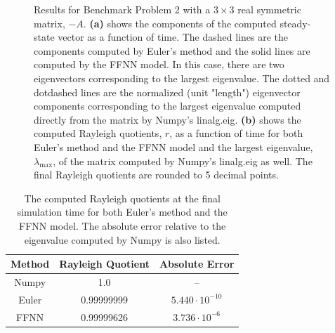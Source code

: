 \begin{figure}[H]
\centering
{}
\qquad
{}
\caption{Results for Benchmark Problem 2 with a $3\times 3$ real symmetric matrix, $-A$. \textbf{(a)} shows the components of the computed steady-state vector as a function of time. The dashed lines are the components computed by Euler's method and the solid lines are computed by the FFNN model. In this case, there are two eigenvectors corresponding to the largest eigenvalue. The dotted and dotdashed lines are the normalized (unit "length") eigenvector components corresponding to the largest eigenvalue computed directly from the matrix by Numpy's linalg.eig. \textbf{(b)} shows the computed Rayleigh quotients, $r$, as a function of time for both Euler's method and the FFNN model and the largest eigenvalue, $\lambda_\mathrm{max}$, of the matrix computed by Numpy's linalg.eig as well. The final Rayleigh quotients are rounded to 5 decimal points.}
\label{fig:benchrun3}
\end{figure}

\begin{table}[H]
\caption{The computed Rayleigh quotients at the final simulation time for both Euler's method and the FFNN model. The absolute error relative to the eigenvalue computed by Numpy is also listed.}
\centering
{}
\begin{tabular}{c|c|c}
\hline
\hline 
Method & Rayleigh Quotient & Absolute Error
\\
\hline 
\hline 
Numpy & 1.0 & –
\\
Euler & 0.99999999 & $5.440 \cdot 10^{-10}$  
\\
FFNN & 0.99999626 & $3.736 \cdot 10^{-6}$
\\
\hline
\hline 
\end{tabular}
\label{tab:eigbench3}
\end{table}

